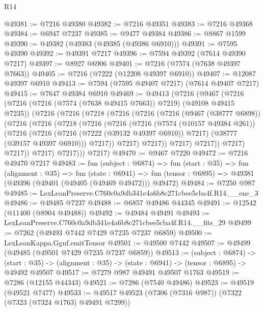 \begin{lexlean}{R14}
\begin{coremodule}
@49381 := @7216 @49380
@49382 := @7216 @49351
@49383 := @7216 @49368
@49384 := @6947 @7237
@49385 := @9477 @49384
@49386 := @8867 @1599
@49390 := @49382 (@49383 (@49385 (@49386 @6910)))
@49391 := @7595 @49390
@49392 := @49391 @7217
@49396 := @7594 @49392 (@7614 @49390 @7217)
@49397 := @8927 @6906
@49401 := @7216 (@7574 (@7638 @49397 @7663))
@49405 := @7216 (@7222 (@12208 @49397 @6910))
@49407 := @12087 @49397 @6910
@49413 := @7594 (@7595 @49407 @7217) (@7614 @49407 @7217)
@49415 := @7647 @49384 @6910
@49469 := @49413
    (@7216
      (@9467
        (@7216
          (@7216 (@7216 (@7574 (@7638 @49415 @7663)) @7219) (@49108 @49415 @7235))
          (@7216
            (@7216
              (@7218
                (@7216
                  (@7216
                    (@7216
                      (@9467 (@38777 @6898))
                      (@7216
                        (@7216
                          (@7218
                            (@7216
                              (@7216
                                (@7216
                                  (@7574 (@10157 @49384 @261))
                                  (@7216
                                    (@7216
                                      (@7216 (@7222 (@39132 @49397 @6910)) @7217)
                                      (@38777 (@39157 @49397 @6910)))
                                    @7217))
                                @7217)
                              @7217))
                          @7217)
                        @7217))
                    @7217)
                  @7217))
              @7217)
            @7217)))
      @7217)
@49470 := @9467 @7220
@49472 := @7216 @49470 @7217
@49483 := fun (subject : @6874) =>
  fun (start : @35) =>
  fun (alignment : @35) =>
  fun (state : @6941) =>
  fun (tensor : @6895) => @49381 (@49396 (@49401 (@49405 (@49469 @49472))) @49472)
@49484 := @7250 @987
@49485 := LexLeanPreserve.C760c0a9db341e4a6b8c271cbee5cba4f.R14.__enc_3
@49486 := @49485 @7237
@49488 := @6857 @49486 @44345
@49491 := @12542 (@11400 (@8904 @49488))
@49492 := @49484 @49491
@49493 := LexLeanPreserve.C760c0a9db341e4a6b8c271cbee5cba4f.R14.__fits_29
@49499 := @7262 (@49493 @7442 @7429 @7235 @7237 @6859)
@49500 := LexLeanKappa.Gguf.emitTensor
@49501 := @49500 @7442
@49507 := @49499 (@49485 (@49501 @7429 @7235 @7237 @6859))
@49513 := (subject : @6874) ->
  (start : @35) -> (alignment : @35) -> (state : @6941) -> (tensor : @6895) -> @49492 @49507
@49517 := @7279 @987 @49491 @49507 @1763
@49519 := @7286 (@12155 @44343)
@49521 := @7286 (@7540 @49486)
@49523 := @49519 (@49521 @7477)
@49533 := @49517 @49523 (@7306 (@7316 @987)) (@7322 (@7323 (@7324 @1763) @49491 @7299))

\end{coremodule}
\end{lexlean}
